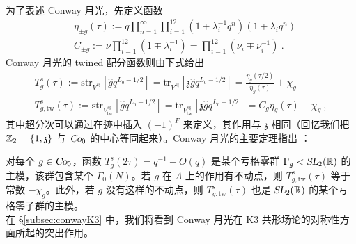 为了表述 Conway 月光，先定义函数
\begin{equation}
\label{eta_g_and_C_g}
\begin{split}
&\eta_{\pm g}(\tau):=q\prod_{n=1}^{\infty}\prod_{i=1}^{12}\left(1\mp\lambda_i^{-1}q^n\right)\left(1\mp\lambda_iq^n\right) \\
&C_{\pm g}:=\nu\prod_{i=1}^{12}\left(1\mp\lambda_i^{-1}\right)=\prod_{i=1}^{12}\left(\nu_i\mp\nu_i^{-1}\right)~.
\end{split}
\end{equation}
Conway 月光的 twined 配分函数则由下式给出
\begin{equation}
\begin{split}
T^s_g(\tau):=\text{str}_{V^{s\natural}}\left[\hat{g}q^{L_0-1/2}\right]=\text{tr}_{V^{s\natural}}\left[\mathfrak{z}\hat{g}q^{L_0-1/2}\right]=\frac{\eta_g(\tau/2)}{\eta_g(\tau)}+\chi_g \\
T^s_{g,\text{tw}}(\tau):=\text{str}_{V^{s\natural}_{\text{tw}}}\left[\hat{g}q^{L_0-1/2}\right]=\text{tr}_{V^{s\natural}_{\text{tw}}}\left[\mathfrak{z}\hat{g}q^{L_0-1/2}\right]=C_g\eta_g(\tau)-\chi_g~,
\end{split}
\end{equation}
其中超分次可以通过在迹中插入 $(-1)^F$ 来定义，其作用与 $\mathfrak{z}$ 相同（回忆我们把 $\mathbb{Z}_2=\lbrace1,\mathfrak{z}\rbrace$ 与 $\operatorname{\textsl{Co}}_0$ 的中心等同起来）。Conway 月光的主要定理指出 \cite{DuncanJohnf.r.2015TMMF}：



{\thm  \label{thm:conway_moonshine} 对每个 $g\in\operatorname{\textsl{Co}}_0$，函数 $T_g^s(2\tau)=q^{-1}+O(q)$ 是某个亏格零群 $\Gamma_g<\operatorname{\textsl{SL}}_2(\mathbb{R})$ 的主模，该群包含某个 $\Gamma_0(N)$。若 $g$ 在 $\Lambda$ 上的作用有不动点，则 $T^s_{g,\text{tw}}(\tau)$ 等于常数 $-\chi_g$。此外，若 $g$ 没有这样的不动点，则 $T^s_{g,\text{tw}}(\tau)$ 也是 $\operatorname{\textsl{SL}}_2(\mathbb{R})$ 的某个亏格零子群的主模。}\\


在 \S\ref{subsec:conwayK3} 中，我们将看到 Conway 月光在 K3 共形场论的对称性方面所起的突出作用。
